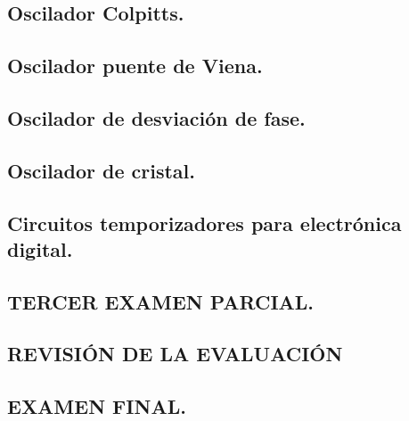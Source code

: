 \documentclass{myarticle}
\begin{document}
\subsection{Oscilador Colpitts.}
\subsection{Oscilador puente de Viena.}
\subsection{Oscilador de desviación de fase.}
\subsection{Oscilador de cristal.}
\subsection{Circuitos temporizadores para electrónica digital.}
\subsection{{\bf TERCER EXAMEN PARCIAL.}}
\subsection{{\bf REVISIÓN DE LA EVALUACIÓN}}
\subsection{{\bf EXAMEN FINAL.}}
\end{document}
